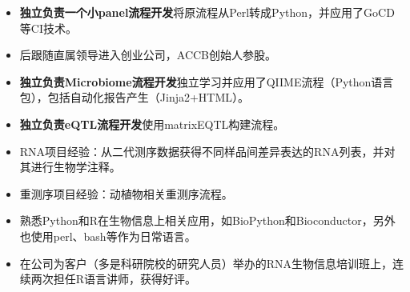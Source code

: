 \documentclass{resume}
\begin{document}
\begin{itemize}
  \item \textbf{独立负责一个小panel流程开发}将原流程从Perl转成Python，并应用了GoCD等CI技术。
  \item 后跟随直属领导进入创业公司，ACCB创始人参股。
\end{itemize}

\begin{itemize}
  \item \textbf{独立负责Microbiome流程开发}独立学习并应用了QIIME流程（Python语言包），包括自动化报告产生（Jinja2+HTML）。
\end{itemize}

\begin{itemize}
  \item \textbf{独立负责eQTL流程开发}使用matrixEQTL构建流程。
  \item RNA项目经验：从二代测序数据获得不同样品间差异表达的RNA列表，并对其进行生物学注释。
  \item 重测序项目经验：动植物相关重测序流程。
  \item 熟悉Python和R在生物信息上相关应用，如BioPython和Bioconductor，另外也使用perl、bash等作为日常语言。
  \item 在公司为客户（多是科研院校的研究人员）举办的RNA生物信息培训班上，连续两次担任R语言讲师，获得好评。
\end{itemize}



\end{document}
